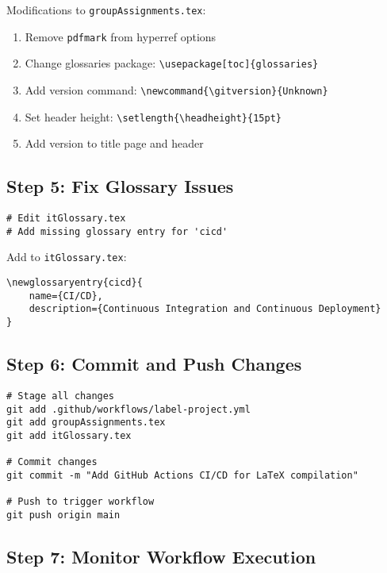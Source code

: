 Modifications to \texttt{groupAssignments.tex}:

\begin{enumerate}
    \item Remove \texttt{pdfmark} from hyperref options
    \item Change glossaries package: \texttt{\textbackslash usepackage[toc]\{glossaries\}}
    \item Add version command: \texttt{\textbackslash newcommand\{\textbackslash gitversion\}\{Unknown\}}
    \item Set header height: \texttt{\textbackslash setlength\{\textbackslash headheight\}\{15pt\}}
    \item Add version to title page and header
\end{enumerate}

\subsection{Step 5: Fix Glossary Issues}

\begin{verbatim}
# Edit itGlossary.tex
# Add missing glossary entry for 'cicd'
\end{verbatim}

Add to \texttt{itGlossary.tex}:
\begin{verbatim}
\newglossaryentry{cicd}{
    name={CI/CD},
    description={Continuous Integration and Continuous Deployment}
}
\end{verbatim}

\subsection{Step 6: Commit and Push Changes}

\begin{verbatim}
# Stage all changes
git add .github/workflows/label-project.yml
git add groupAssignments.tex
git add itGlossary.tex

# Commit changes
git commit -m "Add GitHub Actions CI/CD for LaTeX compilation"

# Push to trigger workflow
git push origin main
\end{verbatim}

\subsection{Step 7: Monitor Workflow Execution}

